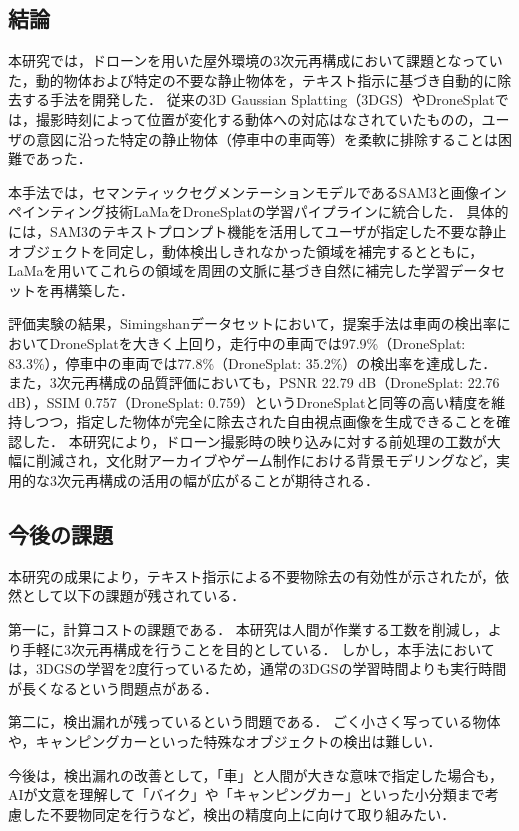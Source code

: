 \documentclass[a4paper,dvipdfmx,ja=standard,9pt]{bxjsarticle}
\begin{document}
\subsection{結論}
本研究では，ドローンを用いた屋外環境の3次元再構成において課題となっていた，動的物体および特定の不要な静止物体を，テキスト指示に基づき自動的に除去する手法を開発した．
従来の3D Gaussian Splatting（3DGS）やDroneSplatでは，撮影時刻によって位置が変化する動体への対応はなされていたものの，ユーザの意図に沿った特定の静止物体（停車中の車両等）を柔軟に排除することは困難であった．

本手法では，セマンティックセグメンテーションモデルであるSAM3と画像インペインティング技術LaMaをDroneSplatの学習パイプラインに統合した．
具体的には，SAM3のテキストプロンプト機能を活用してユーザが指定した不要な静止オブジェクトを同定し，動体検出しきれなかった領域を補完するとともに，LaMaを用いてこれらの領域を周囲の文脈に基づき自然に補完した学習データセットを再構築した．

評価実験の結果，Simingshanデータセットにおいて，提案手法は車両の検出率においてDroneSplatを大きく上回り，走行中の車両では97.9\%（DroneSplat: 83.3\%），停車中の車両では77.8\%（DroneSplat: 35.2\%）の検出率を達成した．
また，3次元再構成の品質評価においても，PSNR 22.79 dB（DroneSplat: 22.76 dB），SSIM 0.757（DroneSplat: 0.759）というDroneSplatと同等の高い精度を維持しつつ，指定した物体が完全に除去された自由視点画像を生成できることを確認した．
本研究により，ドローン撮影時の映り込みに対する前処理の工数が大幅に削減され，文化財アーカイブやゲーム制作における背景モデリングなど，実用的な3次元再構成の活用の幅が広がることが期待される．

\subsection{今後の課題}
本研究の成果により，テキスト指示による不要物除去の有効性が示されたが，依然として以下の課題が残されている．

第一に，計算コストの課題である．
本研究は人間が作業する工数を削減し，より手軽に3次元再構成を行うことを目的としている．
しかし，本手法においては，3DGSの学習を2度行っているため，通常の3DGSの学習時間よりも実行時間が長くなるという問題点がある．

第二に，検出漏れが残っているという問題である．
ごく小さく写っている物体や，キャンピングカーといった特殊なオブジェクトの検出は難しい．

今後は，検出漏れの改善として，「車」と人間が大きな意味で指定した場合も，AIが文意を理解して「バイク」や「キャンピングカー」といった小分類まで考慮した不要物同定を行うなど，検出の精度向上に向けて取り組みたい．



\newpage
\begingroup
  
  
\endgroup
\end{document}
